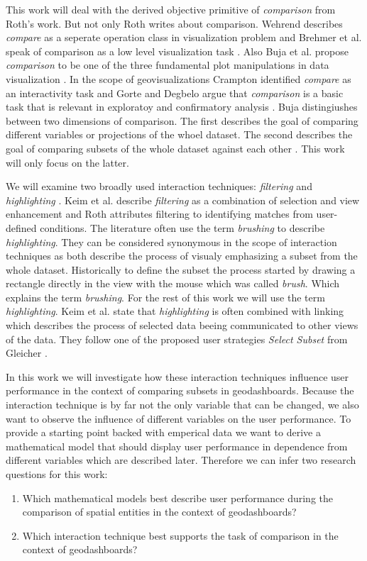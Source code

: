 This work will deal with the derived objective primitive of \textit{comparison} from Roth's work.
But not only Roth writes about comparison. Wehrend describes \textit{compare} as a seperate
operation class in visualization problem \citep{Wehrend.1990} and Brehmer et al.
speak of comparison as a low level visualization task \citep*{Brehmer.2013}. Also Buja et al. propose
\textit{comparison} to be one of the three fundamental plot manipulations in data visualization \citep*{Buja.1996}. In the
scope of geovisualizations Crampton identified \textit{compare} as an interactivity task
\citep{Crampton.2002} and Gorte and Degbelo argue that \textit{comparison} is a basic
task that is relevant in exploratoy and confirmatory analysis \citep{Gorte.2022}.
Buja distingiushes between two dimensions of comparison. The first
describes the goal of comparing different variables or projections of the whoel dataset.
The second describes the goal of comparing subsets of the whole dataset against each
other \citep*{Buja.1996}. This work will only focus on the latter. 

We will examine two broadly used interaction techniques: \textit{filtering} and
\textit{highlighting} \citep*{Keim.2005,Roth.2013}. Keim et al. describe \textit{filtering} as a
combination of selection and view enhancement and Roth attributes filtering to identifying matches
from user-defined conditions. The literature often use the term \textit{brushing} 
to describe \textit{highlighting}. They can be considered synonymous in the scope of interaction techniques
as both describe the process of visualy emphasizing a subset from the whole dataset.
Historically to define the subset the process started by drawing a rectangle directly in the view with the
mouse which was called \textit{brush}. Which explains the term \textit{brushing}.
For the rest of this work we will use the term \textit{highlighting}. Keim et al. state
that \textit{highlighting} is often combined with linking which describes the process of selected data
beeing communicated to other views of the data. They follow one of the proposed user strategies
\textit{Select Subset} from Gleicher \citep*{Gleicher.2018}.

In this work we will investigate how these interaction techniques influence user performance
in the context of comparing subsets in geodashboards. Because the interaction technique is
by far not the only variable that can be changed, we also want to observe the influence of
different variables on the user performance. To provide a starting point backed with emperical
data we want to derive a mathematical model that should display user performance in dependence
from different variables which are described later. Therefore we can infer two research
questions for this work:
\begin{enumerate}
    \item Which mathematical models best describe user performance during the comparison of spatial entities
    in the context of geodashboards?
    \item Which interaction technique best supports the task of comparison in the context of
    geodashboards? 
\end{enumerate}

